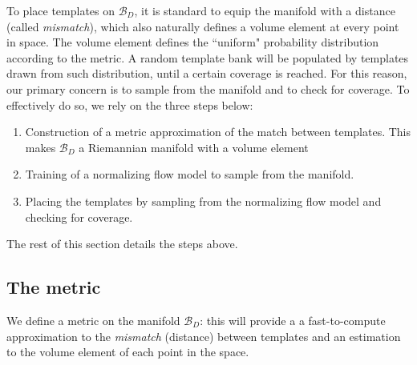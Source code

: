 \documentclass[twocolumn,showpacs,preprintnumbers,nofootinbib,prd,
superscriptaddress,10pt]{revtex4-2}
\begin{document}
To place templates on $\mathcal{B}_D$, it is standard to equip the manifold with a distance (called {\it mismatch}), which also naturally defines a volume element at every point in space. The volume element defines the ``uniform" probability distribution according to the metric.
A random template bank will be populated by templates drawn from such distribution, until a certain coverage is reached. For this reason, our primary concern is to sample from the manifold and to check for coverage. To effectively do so, we rely on the three steps below:
\begin{enumerate}
	\item Construction of a metric approximation of the match between templates. This makes $\mathcal{B}_D$ a Riemannian manifold with a volume element
	\item Training of a normalizing flow model to sample from the manifold. 
	\item Placing the templates by sampling from the normalizing flow model and checking for coverage.
\end{enumerate}
The rest of this section details the steps above.

\subsection{The metric} \label{sec:metric}

We define a metric on the manifold $\mathcal{B}_D$: this will provide a a fast-to-compute approximation to the {\it mismatch} (distance) between templates and an estimation to the volume element of each point in the space.
\end{document}

